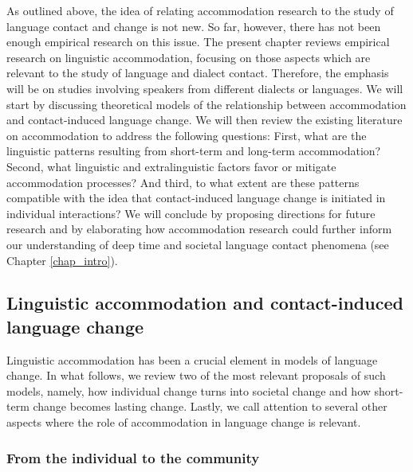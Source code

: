 \documentclass[output=paper]{langscibook}
\begin{document}
As outlined above, the idea of relating accommodation research to the study of language contact and change is not new. So far, however, there has not been enough empirical research on this issue. The present chapter reviews empirical research on linguistic accommodation, focusing on those aspects which are relevant to the study of language and dialect contact. Therefore, the emphasis will be on studies involving speakers from different dialects or languages. We will start by discussing theoretical models of the relationship between accommodation and contact-induced language change. We will then review the existing literature on accommodation to address the following questions: First, what are the linguistic patterns resulting from short-term and long-term accommodation? Second, what linguistic and extralinguistic factors favor or mitigate accommodation processes? And third, to what extent are these patterns compatible with the idea that contact-induced language change is initiated in individual interactions? We will conclude by proposing directions for future research and by elaborating how accommodation research could further inform our understanding of deep time and societal language contact phenomena (see Chapter \ref{chap_intro}).

\subsection{Linguistic accommodation and contact-induced language change}

Linguistic accommodation has been a crucial element in models of language change. In what follows, we review two of the most relevant proposals of such models, namely, how individual change turns into societal change and how short-term change becomes lasting change. Lastly, we call attention to several other aspects where the role of accommodation in language change is relevant.

\subsubsection{From the individual to the community}
\end{document}

